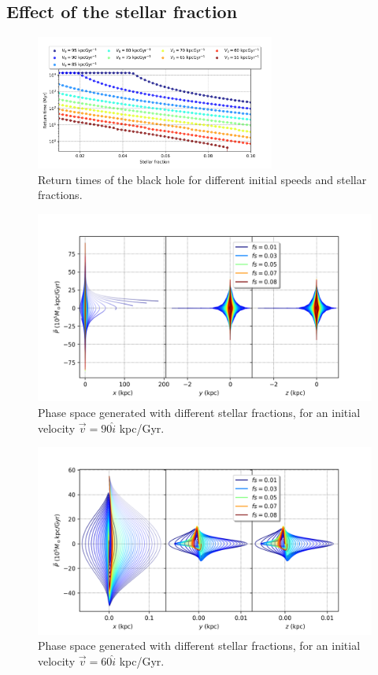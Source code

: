 	\subsection{Effect of the stellar fraction}
	\begin{figure}[h]
		\centering
		\includegraphics[width = 0.7\textwidth]{"../Files/Week 7/Symmetric/returntimes_stellar_speed"}
		\caption{Return times of the black hole for different initial speeds and stellar fractions.}
		\label{fig: stellarfraction}
	\end{figure}
	\begin{figure}[h]
		\centering
		\includegraphics[width = 0.9\linewidth]{"../Files/Week 9/PhaseSpace_escape"}
		\caption{Phase space generated with different stellar fractions, for an initial velocity $\vec{v} = 90\hat{i}$ kpc/Gyr.}
		\label{fig: escapePhaseSpace}
	\end{figure}
	\begin{figure}[h]
		\centering
		\includegraphics[width = 0.9\linewidth]{"../Files/Week 9/PhaseSpace_in"}
		\caption{Phase space generated with different stellar fractions, for an initial velocity $\vec{v} = 60\hat{i}$ kpc/Gyr.}
		\label{fig: escapeInner}
	\end{figure}

